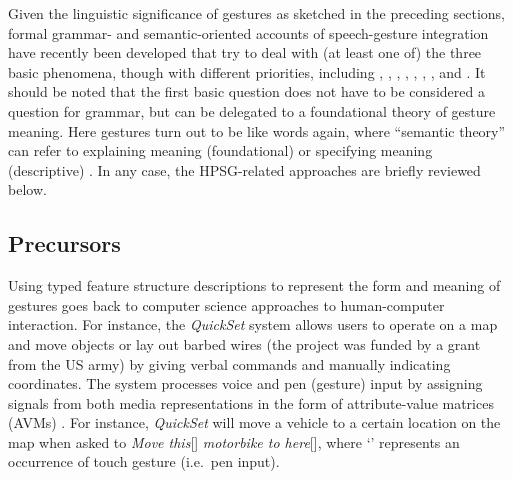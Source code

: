 \documentclass[output=paper
                ,modfonts
                ,nonflat
	        ,collection
	        ,collectionchapter
	        ,collectiontoclongg
 	        ,biblatex
                ,babelshorthands
                ,newtxmath
                ,draftmode
                ,colorlinks, citecolor=brown
]{./langsci/langscibook}
\begin{document}
Given the linguistic significance of gestures as sketched in the preceding sections, formal grammar- and semantic-oriented accounts of speech-gesture integration have recently been developed that try to deal with (at least one of) the three basic phenomena, though with different priorities, including
%
\citet{Alahverdzhieva:2013}, 
%
\citet{Alahverdzhieva:Lascarides:2010},
%
\cite{Ebert:2014:a},
%
\citet{Giorgolo:2010},
%
\citet{Giorgolo:Asudeh:2011},
%
\citet{Luecking:2013:a,Luecking:2016},
%
\citet{Rieser:2008,Rieser:2011,Rieser:2015},
%
\citet{Rieser:Poesio:2009} and
%
\citet{Schlenker:2018}.
%
It should be noted that the first basic question does not have to be considered a question for grammar, but can be delegated to a foundational theory of gesture meaning.
%
Here gestures turn out to be like words again, where \enquote{semantic theory} can refer to explaining meaning (foundational) or specifying meaning (descriptive) \citep[]{Lewis:1970}.
%
In any case, the HPSG-related approaches are briefly reviewed below.
%



\subsection{Precursors} 
\label{sec:precursors}

Using typed feature structure descriptions to represent the form and meaning of gestures goes back to computer science approaches to human-computer interaction. %
%
For instance, the \textit{QuickSet} system  \citep{Cohen:et:al:1997} allows users to operate on a map and move objects or lay out barbed wires (the project was funded by a grant from the US army) by giving verbal commands and manually indicating coordinates.
%
The system processes voice and pen (gesture) input by assigning signals from both media representations in the form of attribute-value matrices (AVMs) \citep{Johnston:1998,Johnston:et:al:1997}.
%
For instance, \textit{QuickSet} will move a vehicle to a certain location on the map when asked to \emph{Move this}[\Pointing] \emph{motorbike to here}[\Pointing], where \enquote*{\Pointing} represents an occurrence of touch gesture (i.e.\ pen input). 
\end{document}
